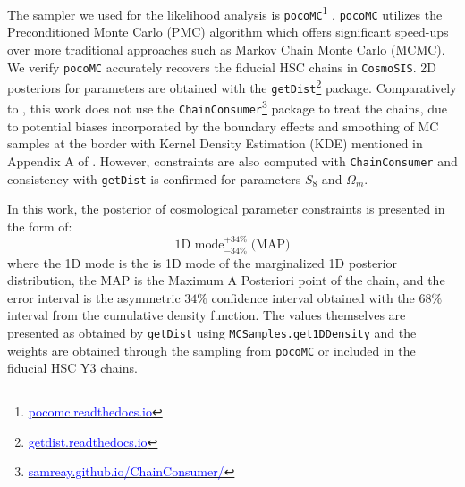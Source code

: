 The sampler we used for the likelihood analysis is \texttt{pocoMC}\footnote{\href{https://pocomc.readthedocs.io/en/latest/}{\textcolor{blue}{pocomc.readthedocs.io}}} \cite{karamanis2022pocoMC1, karamanis2022pocoMC2}. \texttt{pocoMC} utilizes the Preconditioned Monte Carlo (PMC) algorithm which offers significant speed-ups over more traditional approaches such as Markov Chain Monte Carlo (MCMC). We verify \texttt{pocoMC} accurately recovers the fiducial HSC chains in \texttt{CosmoSIS}. 2D posteriors for parameters are obtained with the \texttt{getDist}\footnote{\href{https://getdist.readthedocs.io/en/latest/}{\textcolor{blue}{getdist.readthedocs.io}}} \cite{getDistLewis2025} package. Comparatively to \cite{Li2023_HSCY3_CosmicShear}, this work does not use the \texttt{ChainConsumer}\footnote{\href{https://samreay.github.io/ChainConsumer/}{\textcolor{blue}{samreay.github.io/ChainConsumer/}}} \cite{ChainConsumer_Hinton2016} package to treat the chains, due to potential biases incorporated by the boundary effects and smoothing of MC samples at the border with Kernel Density Estimation (KDE) mentioned in Appendix A of \cite{Li2023_HSCY3_CosmicShear}. However, constraints are also computed with \texttt{ChainConsumer} and consistency with \texttt{getDist} is confirmed for parameters $S_8$ and $\Omega_m$.

In this work, the posterior of cosmological parameter constraints is presented in the form of:
\begin{equation}\label{eq:presentation}
    \text{1D mode} ^ {+34\%} _ {-34\%}\;\text{(MAP)}
\end{equation}
where the 1D mode is the is 1D mode of the marginalized 1D posterior distribution, the MAP is the Maximum A Posteriori point of the chain, and the error interval is the asymmetric $34\%$ confidence interval obtained with the $68\%$ interval from the cumulative density function. The values themselves are presented as obtained by \texttt{getDist} using \texttt{MCSamples.get1DDensity} and the weights are obtained through the sampling from \texttt{pocoMC} or included in the fiducial HSC Y3 chains.
